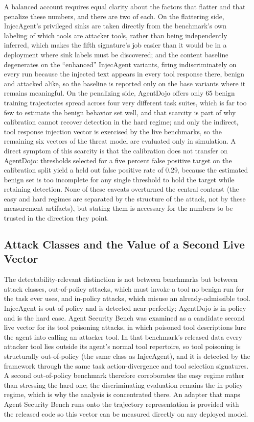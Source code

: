 \documentclass[journal]{IEEEtran}
\theoremstyle{remark}
\begin{document}
A balanced account requires equal clarity about the factors that flatter and that penalize these numbers, and there are two of each. On the flattering side, InjecAgent's privileged sinks are taken directly from the benchmark's own labeling of which tools are attacker tools, rather than being independently inferred, which makes the fifth signature's job easier than it would be in a deployment where sink labels must be discovered; and the content baseline degenerates on the ``enhanced'' InjecAgent variants, firing indiscriminately on every run because the injected text appears in every tool response there, benign and attacked alike, so the baseline is reported only on the base variants where it remains meaningful. On the penalizing side, AgentDojo offers only 65 benign training trajectories spread across four very different task suites, which is far too few to estimate the benign behavior set well, and that scarcity is part of why calibration cannot recover detection in the hard regime; and only the indirect, tool response injection vector is exercised by the live benchmarks, so the remaining six vectors of the threat model are evaluated only in simulation. A direct symptom of this scarcity is that the calibration does not transfer on AgentDojo: thresholds selected for a five percent false positive target on the calibration split yield a held out false positive rate of 0.29, because the estimated benign set is too incomplete for any single threshold to hold the target while retaining detection. None of these caveats overturned the central contrast (the easy and hard regimes are separated by the structure of the attack, not by these measurement artifacts), but stating them is necessary for the numbers to be trusted in the direction they point.

\subsection{Attack Classes and the Value of a Second Live Vector}
The detectability-relevant distinction is not between benchmarks but between attack classes, out-of-policy attacks, which must invoke a tool no benign run for the task ever uses, and in-policy attacks, which misuse an already-admissible tool. InjecAgent is out-of-policy and is detected near-perfectly; AgentDojo is in-policy and is the hard case. Agent Security Bench \cite{r10} was examined as a candidate second live vector for its tool poisoning attacks, in which poisoned tool descriptions lure the agent into calling an attacker tool. In that benchmark's released data every attacker tool lies outside its agent's normal tool repertoire, so tool poisoning is structurally out-of-policy (the same class as InjecAgent), and it is detected by the framework through the same task action-divergence and tool selection signatures. A second out-of-policy benchmark therefore corroborates the easy regime rather than stressing the hard one; the discriminating evaluation remains the in-policy regime, which is why the analysis is concentrated there. An adapter that maps Agent Security Bench runs onto the trajectory representation is provided with the released code so this vector can be measured directly on any deployed model.
\end{document}
